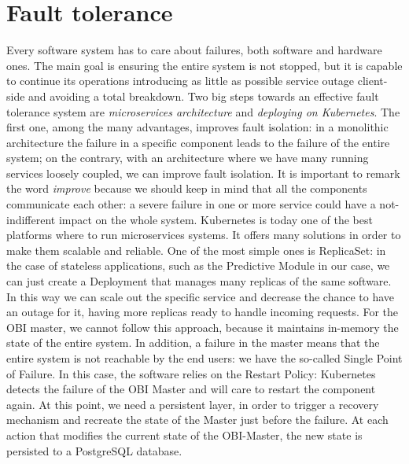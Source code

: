 \documentclass[12pt,twoside,cucitura]{toptesi}
\begin{document}
\section{Fault tolerance}
Every software system has to care about failures, both software and hardware ones. The main goal is ensuring the entire system is not stopped, but it is capable to continue its operations introducing as little as possible service outage client-side and avoiding a total breakdown.
Two big steps towards an effective fault tolerance system are \textit{microservices architecture} and \textit{deploying on Kubernetes}.
The first one, among the many advantages, improves fault isolation: in a monolithic architecture the failure in a specific component leads to the failure of the entire system; on the contrary, with an architecture where we have many running services loosely coupled, we can improve fault isolation. It is important to remark the word \textit{improve} because we should keep in mind that all the components communicate each other: a severe failure in one or more service could have a not-indifferent impact on the whole system.
Kubernetes is today one of the best platforms where to run microservices systems. It offers many solutions in order to make them scalable and reliable. One of the most simple ones is ReplicaSet: in the case of stateless applications, such as the Predictive Module in our case, we can just create a Deployment that manages many replicas of the same software. In this way we can scale out the specific service and decrease the chance to have an outage for it, having more replicas ready to handle incoming requests. For the OBI master, we cannot follow this approach, because it maintains in-memory the state of the entire system. In addition, a failure in the master means that the entire system is not reachable by the end users: we have the so-called Single Point of Failure. In this case, the software relies on the Restart Policy:  Kubernetes detects the failure of the OBI Master and will care to restart the component again. At this point, we need a persistent layer, in order to trigger a recovery mechanism and recreate the state of the Master just before the failure.
At each action that modifies the current state of the OBI-Master, the new state is persisted to a PostgreSQL database.
\end{document}
